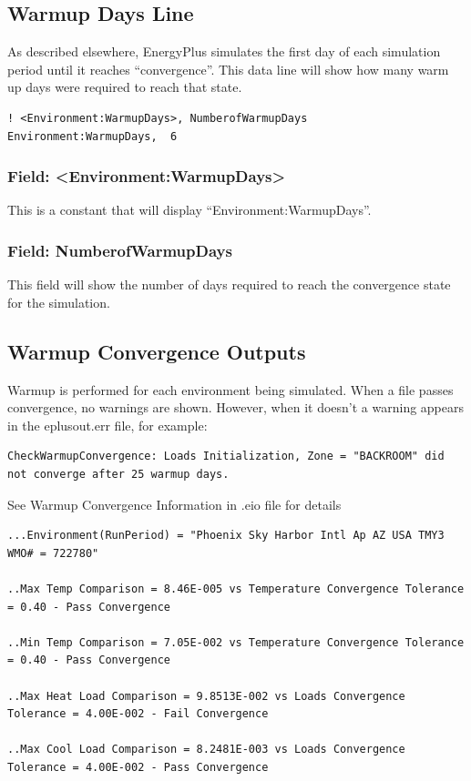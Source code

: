 \subsection{Warmup Days Line}

As described elsewhere, EnergyPlus simulates the first day of each simulation period until it reaches ``convergence''. This data line will show how many warm up days were required to reach that state.

\begin{lstlisting}
! <Environment:WarmupDays>, NumberofWarmupDays
Environment:WarmupDays,  6
\end{lstlisting}

\subsubsection{Field: <Environment:WarmupDays>}

This is a constant that will display ``Environment:WarmupDays''.

\subsubsection{Field: NumberofWarmupDays}

This field will show the number of days required to reach the convergence state for the simulation.

\subsection{Warmup Convergence Outputs}

Warmup is performed for each environment being simulated. When a file passes convergence, no warnings are shown.  However, when it doesn't a warning appears in the eplusout.err file, for example:

\begin{lstlisting}
CheckWarmupConvergence: Loads Initialization, Zone = "BACKROOM" did not converge after 25 warmup days.
\end{lstlisting}

See Warmup Convergence Information in .eio file for details

\begin{lstlisting}
...Environment(RunPeriod) = "Phoenix Sky Harbor Intl Ap AZ USA TMY3 WMO# = 722780"

..Max Temp Comparison = 8.46E-005 vs Temperature Convergence Tolerance = 0.40 - Pass Convergence

..Min Temp Comparison = 7.05E-002 vs Temperature Convergence Tolerance = 0.40 - Pass Convergence

..Max Heat Load Comparison = 9.8513E-002 vs Loads Convergence Tolerance = 4.00E-002 - Fail Convergence

..Max Cool Load Comparison = 8.2481E-003 vs Loads Convergence Tolerance = 4.00E-002 - Pass Convergence
\end{lstlisting}

